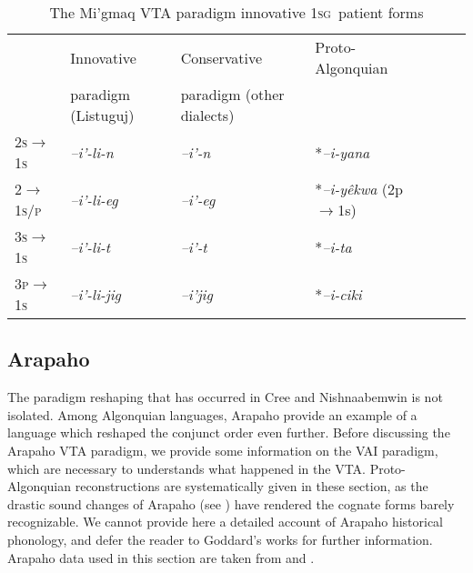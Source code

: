 \documentclass[twoside,a4paper,11pt]{article}
\newcommand{\ipa}[1]{{\phon\textit{#1}}}
\newcommand{\sg}{\textsc{sg}}
\newcommand{\grise}[1]{\cellcolor{lightgray}\textbf{#1}}
\newcommand{\Σ}{\greek{Σ}}
\begin{document}
\begin{table}[H]
\caption{The Mi'gmaq VTA paradigm innovative 1\sg\ patient forms}
\centering \label{tab:migmaq.vta.innov.1s}
\begin{tabular}{lllllll}
\toprule
& Innovative & Conservative & Proto-Algonquian \\
&paradigm (Listuguj) & paradigm (other dialects) &\\
\midrule
\textsc{2s$\rightarrow$1s} &\ipa{--i'-li-n} \grise{}& 	\ipa{--i'-n} & *\ipa{--i-yana}\\
\textsc{2$\rightarrow$1s/p} &\ipa{--i'-li-eg} \grise{}& 	\ipa{--i'-eg} & *\ipa{--i-yêkwa} (2p$\rightarrow$1s)\\
\midrule
\textsc{3s$\rightarrow$1s} & 	\ipa{--i'-li-t} \grise{}& 	\ipa{--i'-t} &  *\ipa{--i-ta} \\
\textsc{3p$\rightarrow$1s} & 	\ipa{--i'-li-jig} \grise{}& 	\ipa{--i'jig}  &*\ipa{--i-ciki} \\
\bottomrule
\end{tabular}
\end{table}


\subsection{Arapaho}

The paradigm reshaping that has occurred in Cree and Nishnaabemwin is not isolated. Among Algonquian languages, Arapaho provide an example of a language which reshaped the conjunct order even further. Before discussing the Arapaho VTA paradigm, we provide some information on the VAI   paradigm, which are necessary to understands what happened in the VTA. Proto-Algonquian reconstructions are systematically given in these section, as the drastic sound changes of Arapaho (see \citealt{goddard74arapaho}) have rendered the cognate forms barely recognizable. We cannot provide here a detailed account of Arapaho historical phonology, and defer the reader to Goddard's works for further information. Arapaho data used in this section are taken from \citet{salzmann67arapaho.verb} and \citet{cowell06arapaho}.
\end{document}
